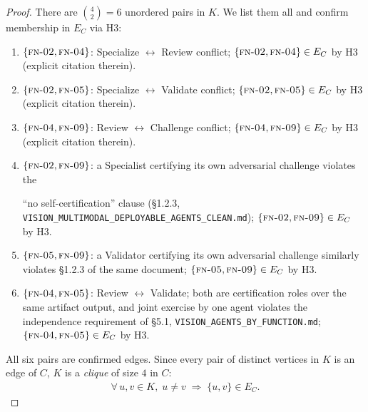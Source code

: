 \documentclass[12pt]{article}
\theoremstyle{definition}
\newcommand{\code}[1]{\texttt{#1}}
\newcommand{\FN}[1]{\textsc{fn-#1}}
\newcommand{\VisionClean}{\code{VISION\_MULTIMODAL\_\allowbreak DEPLOYABLE\_\allowbreak AGENTS\_CLEAN.md}}
\newcommand{\VisionFunc}{\code{VISION\_AGENTS\_\allowbreak BY\_FUNCTION.md}}
\begin{document}
\begin{proof}
There are $\binom{4}{2} = 6$ unordered pairs in $K$.
We list them all and confirm membership in $E_C$ via H3:
\begin{enumerate}
    \item[II.1] $\{\FN{02},\FN{04}\}$: Specialize $\leftrightarrow$
                Review conflict; $\{\FN{02},\FN{04}\} \in E_C$
                by H3 (explicit citation therein).
    \item[II.2] $\{\FN{02},\FN{05}\}$: Specialize $\leftrightarrow$
                Validate conflict; $\{\FN{02},\FN{05}\} \in E_C$
                by H3 (explicit citation therein).
    \item[II.3] $\{\FN{04},\FN{09}\}$: Review $\leftrightarrow$
                Challenge conflict; $\{\FN{04},\FN{09}\} \in E_C$
                by H3 (explicit citation therein).
    \item[II.4] $\{\FN{02},\FN{09}\}$: a Specialist certifying its
                own adversarial challenge violates the
                \begin{sloppypar}
                ``no self-certification'' clause (\S1.2.3,
                \VisionClean{});
                $\{\FN{02},\FN{09}\} \in E_C$ by H3.
                \end{sloppypar}
    \item[II.5] $\{\FN{05},\FN{09}\}$: a Validator certifying its
                own adversarial challenge similarly violates \S1.2.3
                of the same document;
                $\{\FN{05},\FN{09}\} \in E_C$ by H3.
    \item[II.6] $\{\FN{04},\FN{05}\}$: Review $\leftrightarrow$
                Validate; both are certification roles over the same
                artifact output, and joint exercise by one agent
                violates the independence requirement of \S5.1,
                \VisionFunc{};
                $\{\FN{04},\FN{05}\} \in E_C$ by H3.
\end{enumerate}

\noindent All six pairs are confirmed edges.  Since every pair of
distinct vertices in $K$ is an edge of $C$, $K$ is a \emph{clique} of
size $4$ in $C$:
\begin{align}
    \label{eq:clique}
    \forall\, u, v \in K,\; u \neq v
    \;\Longrightarrow\;
    \{u,v\} \in E_C.
\end{align}


\end{proof}
\end{document}
